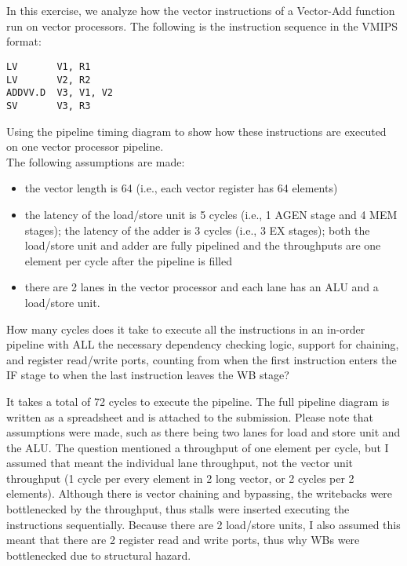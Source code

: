 \documentclass[11pt]{article}
\begin{document}
\section{}

In this exercise, we analyze how the vector instructions of a Vector-Add function run on vector processors. The following is the instruction sequence in the VMIPS format:
\begin{verbatim}
LV       V1, R1
LV       V2, R2
ADDVV.D  V3, V1, V2
SV       V3, R3
\end{verbatim}

Using the pipeline timing diagram to show how these instructions are executed on one vector processor pipeline. \\

The following assumptions are made: 
\begin{itemize}
	\item the vector length is 64 (i.e., each vector register has 64 elements)
	\item the latency of the load/store unit is 5 cycles (i.e., 1 AGEN stage and 4 MEM stages); the latency of the adder is 3 cycles (i.e., 3 EX stages); both the load/store unit and adder are fully pipelined and the throughputs are one element per cycle after the pipeline is filled
	\item there are 2 lanes in the vector processor and each lane has an ALU and a load/store unit. 
\end{itemize}
	
How many cycles does it take to execute all the instructions in an in-order pipeline with ALL the necessary dependency checking logic, support for chaining, and register read/write ports, counting from when the first instruction enters the IF stage to when the last instruction leaves the WB stage?


\begin{Answer}
It takes a total of 72 cycles to execute the pipeline. The full pipeline diagram is written as a spreadsheet and is attached to the submission. Please note that assumptions were made, such as there being two lanes for load and store unit and the ALU. The question mentioned a throughput of one element per cycle, but I assumed that meant the individual lane throughput, not the vector unit throughput (1 cycle per every element in 2 long vector, or 2 cycles per 2 elements). Although there is vector chaining and bypassing, the writebacks were bottlenecked by the throughput, thus stalls were inserted executing the instructions sequentially. Because there are 2 load/store units, I also assumed this meant that there are 2 register read and write ports, thus why WBs were bottlenecked due to structural hazard.
\end{Answer}
\end{document}
